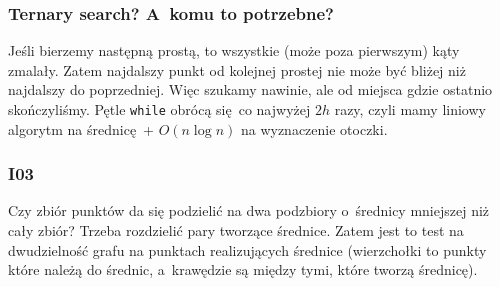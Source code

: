 \subsubsection*{Ternary search? A~komu to potrzebne?}
Jeśli bierzemy następną prostą, to wszystkie (może poza pierwszym) kąty zmalały. Zatem najdalszy punkt od kolejnej prostej nie może być bliżej niż najdalszy do poprzedniej. Więc szukamy nawinie, ale od miejsca gdzie ostatnio skończyliśmy. Pętle \texttt{while} obrócą się co najwyżej \(2h\) razy, czyli mamy liniowy algorytm na średnicę + \(O(n\log{n})\) na wyznaczenie otoczki.
\subsubsection*{I03}
Czy zbiór punktów da się podzielić na dwa podzbiory o~średnicy mniejszej niż cały zbiór? Trzeba rozdzielić pary tworzące średnice. Zatem jest to test na dwudzielność grafu na punktach realizujących średnice (wierzchołki to punkty które należą do średnic, a~krawędzie są między tymi, które tworzą średnicę).
